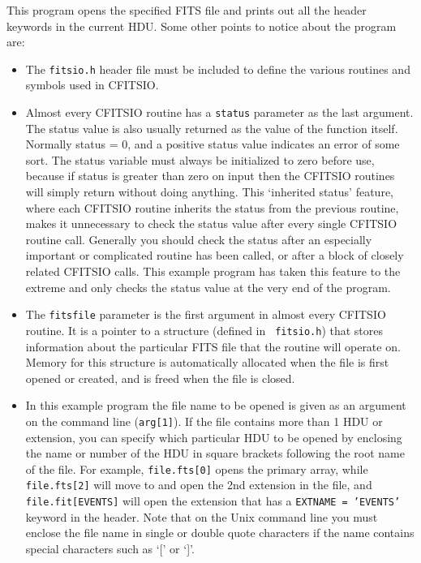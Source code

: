 \documentclass[11pt]{article}
\begin{document}
This program opens the specified FITS file and prints
out all the header keywords in the current HDU.
Some other points to notice about the program are:
\begin{itemize}

\item
The {\tt fitsio.h} header file must be included to define the 
various routines and symbols used in CFITSIO.

\item
Almost every CFITSIO routine has a {\tt status} parameter as the last
argument. The status value is also usually returned as the value of the
function itself.  Normally status = 0, and a positive status value
indicates an error of some sort.  The status variable must always be
initialized to zero before use, because if status is greater than zero
on input then the CFITSIO routines will simply return without doing
anything.  This `inherited status' feature, where each CFITSIO routine
inherits the status from the previous routine, makes it unnecessary to
check the status value after every single CFITSIO routine call.
Generally you should check the status after an especially important or
complicated routine has been called, or after a block of
closely related CFITSIO calls.  This example program has taken this
feature to the extreme and only checks the status value at the 
very end of the program.

\item

The {\tt fitsfile}  parameter is the first argument in almost every
CFITSIO routine.  It is a pointer to a structure (defined in {\tt
fitsio.h}) that stores information about the particular FITS file that
the routine will operate on.  Memory for this structure is
automatically allocated when the file is first opened or created, and
is freed when the file is closed.

\item

In this example program the file name to be opened is given as an
argument on the command line ({\tt arg[1]}).  If the file contains more
than 1 HDU or extension, you can specify which particular HDU to be
opened by enclosing the name or number of the HDU in square brackets
following the root name of the file.  For example, {\tt file.fts[0]}
opens the  primary array, while {\tt file.fts[2]} will move to and open
the 2nd extension in the file, and {\tt file.fit[EVENTS]} will open the
extension that has a {\tt EXTNAME = 'EVENTS'} keyword in the header.
Note that on the Unix command line you must enclose the file name in
single or double quote characters if the name contains special
characters such as `[' or `]'.


\end{itemize}
\end{document}
